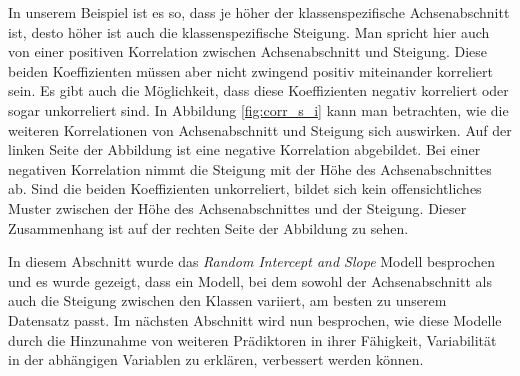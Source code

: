 \documentclass[12pt]{article}\usepackage[]{graphicx}\usepackage[]{color}
\begin{document}
In unserem Beispiel ist es so, dass je höher der klassenspezifische Achsenabschnitt ist, desto höher ist auch die klassenspezifische Steigung. Man spricht hier auch von einer positiven Korrelation zwischen Achsenabschnitt und Steigung. Diese beiden Koeffizienten müssen aber nicht zwingend positiv miteinander korreliert sein. Es gibt auch die Möglichkeit, dass diese Koeffizienten negativ korreliert oder sogar unkorreliert sind. In Abbildung \ref{fig:corr_s_i} kann man betrachten, wie die weiteren Korrelationen von Achsenabschnitt und Steigung sich auswirken. Auf der linken Seite der Abbildung ist eine negative Korrelation abgebildet. Bei einer negativen Korrelation nimmt die Steigung mit der Höhe des Achsenabschnittes ab. Sind die beiden Koeffizienten unkorreliert, bildet sich kein offensichtliches Muster zwischen der Höhe des Achsenabschnittes und der Steigung. Dieser Zusammenhang ist auf der rechten Seite der Abbildung zu sehen.

In diesem Abschnitt wurde das \textit{Random Intercept and Slope} Modell besprochen und es wurde gezeigt, dass ein Modell, bei dem sowohl der Achsenabschnitt als auch die Steigung zwischen den Klassen variiert, am besten zu unserem Datensatz passt. Im nächsten Abschnitt wird nun besprochen, wie diese Modelle durch die Hinzunahme von weiteren Prädiktoren in ihrer Fähigkeit, Variabilität in der abhängigen Variablen zu erklären, verbessert werden können.
\end{document}

